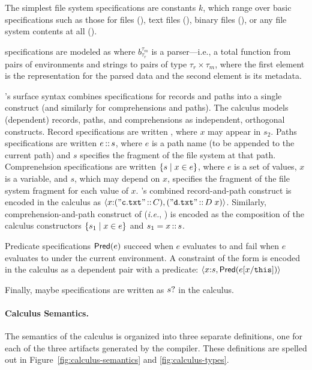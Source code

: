 The simplest file system specifications are constants $k$, which range
over basic specifications such as those for files (\pfile), text files
(\ptext), binary files (\pbin), or any file system contents at all
(\pany).

\padshaskell{} specifications are modeled as  where
$b^{\tau_m}_{\tau_r}$ is a parser---i.e., a total function from pairs
of environments and strings to pairs of type $\tau_r \times \tau_m$,
where the first element is the representation for the parsed data and
the second element is its metadata.

\forest{}'s surface syntax combines specifications for records and
paths into a single construct (and similarly for comprehensions and
paths). The calculus models (dependent) records, paths, and
comprehensions as independent, orthogonal constructs.  Record
specifications are written , where $x$ may appear
in $s_2$.  Paths specifications are written $e\,{::}\,s$, where $e$
is a path name (to be appended to the current path) and $s$ specifies
the fragment of the file system at that path. Comprenehsion
specifications are written $\{ s \mid x \in e \}$, where $e$ is a set of
values, $x$ is a variable, and $s$, which may depend on $x$, specifies
the fragment of the file system fragment for each value of $x$.
\forest{}'s combined record-and-path construct 
 is encoded in the calculus as
$\langle x {:} (\mathtt{"c.txt"}\,{::}\,C), (\mathtt{"d.txt"}\,{::}\,D\; x) \rangle$.  Similarly, comprehension-and-path construct of \forest{} ({\it i.e.}, 
\cd{[x :: s | x <- e]}) is encoded as the composition of the
calculus constructors $\{ s_1 \mid x \in e \}$ and $s_1 = x\,{::}\,s$.

Predicate specifications $\mathsf{Pred}(e)$ succeed when $e$ evaluates to
\True{} and fail when $e$ evaluates to \False under the current
environment.  A \forest{} constraint of the form  is
encoded in the calculus as a dependent pair with a predicate:
$\langle x {:} s, \mathsf{Pred}(e[x/\mathtt{this}]) \rangle$

Finally, maybe specifications are written as $s?$ in the
calculus.

\paragraph*{Calculus Semantics.}
%
The semantics of the calculus is organized into three separate
definitions, one for each of the three artifacts generated by the
\forest{} compiler. These definitions are spelled out in
Figure~\ref{fig:calculus-semantics} and \ref{fig:calculus-types}.

